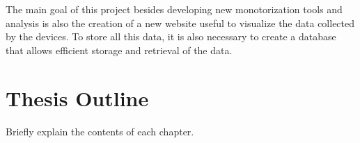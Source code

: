 The main goal of this project besides developing new monotorization
tools and analysis is also the creation of a new website useful to visualize
the data collected by the devices. To store all this data, it is also necessary
to create a database that allows efficient storage and retrieval of the data.


\section{Thesis Outline}
\label{section:outline}

Briefly explain the contents of each chapter.
